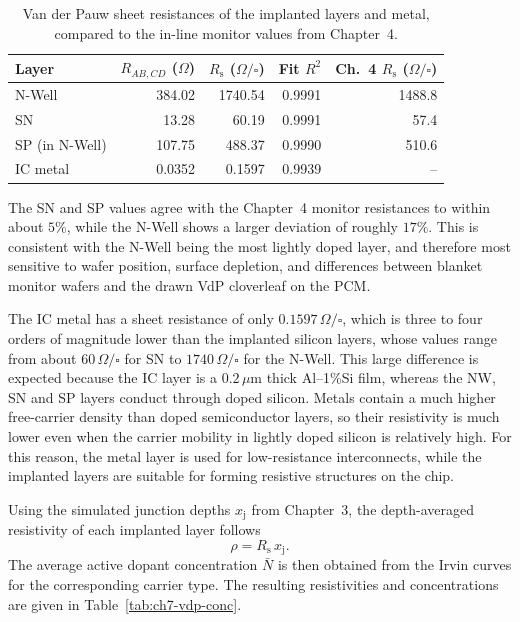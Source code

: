 \begin{table}[htbp]
  \centering
  \caption{Van der Pauw sheet resistances of the implanted layers and metal, compared to the in-line monitor values from Chapter~4.}
  \label{tab:ch7-vdp-rsheet}
  \begin{tabular}{lrrrr}
    \toprule
    Layer & $R_{AB,CD}$ ($\Omega$) & $R_\mathrm{s}$ ($\Omega/\square$) & Fit $R^2$ & Ch.~4 $R_\mathrm{s}$ ($\Omega/\square$) \\
    \midrule
    N-Well      & 384.02  & 1740.54 & 0.9991 & 1488.8 \\
    SN          &  13.28  &   60.19 & 0.9991 &   57.4 \\
    SP (in N-Well) & 107.75 & 488.37 & 0.9990 & 510.6 \\
    IC metal    &   0.0352 & 0.1597 & 0.9939 & -- \\
    \bottomrule
  \end{tabular}
\end{table}

The SN and SP values agree with the Chapter~4 monitor resistances to within about $5\%$, while the N-Well shows a larger deviation of roughly $17\%$. This is consistent with the N-Well being the most lightly doped layer, and therefore most sensitive to wafer position, surface depletion, and differences between blanket monitor wafers and the drawn VdP cloverleaf on the PCM.

The IC metal has a sheet resistance of only $0.1597\,\Omega/\square$, which is three to four orders of magnitude lower than the implanted silicon layers, whose values range from about $60\,\Omega/\square$ for SN to $1740\,\Omega/\square$ for the N-Well. This large difference is expected because the IC layer is a $0.2\,\mu\mathrm{m}$ thick Al--1\%Si film, whereas the NW, SN and SP layers conduct through doped silicon. Metals contain a much higher free-carrier density than doped semiconductor layers, so their resistivity is much lower even when the carrier mobility in lightly doped silicon is relatively high. For this reason, the metal layer is used for low-resistance interconnects, while the implanted layers are suitable for forming resistive structures on the chip.

Using the simulated junction depths $x_\mathrm{j}$ from Chapter~3, the depth-averaged resistivity of each implanted layer follows
\[
  \rho = R_\mathrm{s}\,x_\mathrm{j}.
\]
The average active dopant concentration $\bar N$ is then obtained from the Irvin curves for the corresponding carrier type. The resulting resistivities and concentrations are given in Table~\ref{tab:ch7-vdp-conc}.

